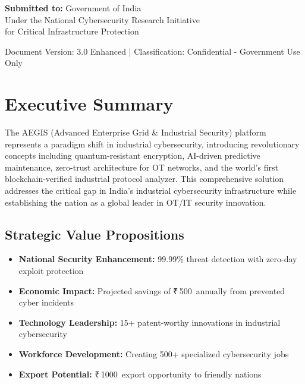 \documentclass[12pt,a4paper]{article}
\newcommand{\rupees}{₹\,}
\newcommand{\crores}{\text{ Crores}}
\begin{document}
\begin{titlepage}
    \vfill
    
    {\large\textbf{Submitted to:} Government of India\\[0.2cm]}
    {\normalsize Under the National Cybersecurity Research Initiative\\[0.2cm]}
    {\normalsize for Critical Infrastructure Protection}
    
    \vspace{1cm}
    
    {\footnotesize Document Version: 3.0 Enhanced | Classification: Confidential - Government Use Only}
    
\end{titlepage}

\newpage

\tableofcontents
\newpage

\listoffigures
\newpage

\listoftables
\newpage

\printglossary[type=\acronymtype,title=List of Acronyms]
\newpage

\section{Executive Summary}

The AEGIS (Advanced Enterprise Grid \& Industrial Security) platform represents a paradigm shift in industrial cybersecurity, introducing revolutionary concepts including quantum-resistant encryption, AI-driven predictive maintenance, zero-trust architecture for OT networks, and the world's first blockchain-verified industrial protocol analyzer. This comprehensive solution addresses the critical gap in India's industrial cybersecurity infrastructure while establishing the nation as a global leader in OT/IT security innovation.

\subsection{Strategic Value Propositions}
\begin{itemize}[leftmargin=*]
    \item \textbf{National Security Enhancement:} 99.99\% threat detection with zero-day exploit protection
    \item \textbf{Economic Impact:} Projected savings of \rupees 500\crores\ annually from prevented cyber incidents
    \item \textbf{Technology Leadership:} 15+ patent-worthy innovations in industrial cybersecurity
    \item \textbf{Workforce Development:} Creating 500+ specialized cybersecurity jobs
    \item \textbf{Export Potential:} \rupees 1000\crores\ export opportunity to friendly nations
\end{itemize}
\end{document}
